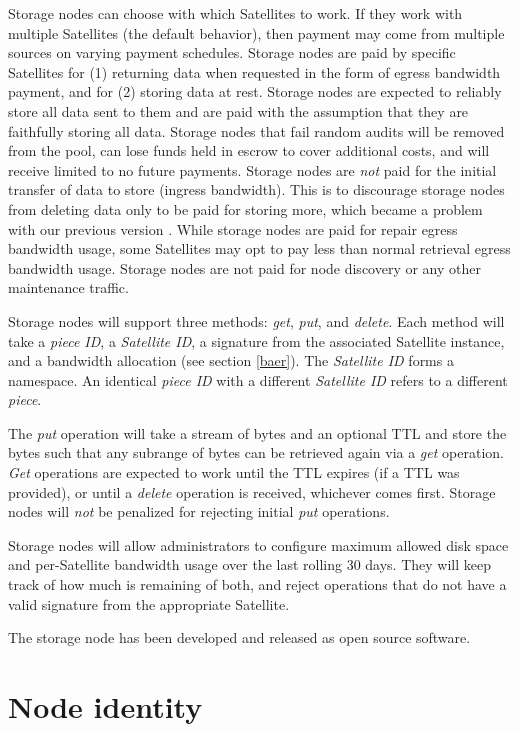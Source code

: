 \documentclass[8pt,fleqn,openany]{book}
\newcommand{\code}[1]{{\em #1}}
\begin{document}
Storage nodes can choose with which Satellites to work. If they work
with multiple Satellites (the default behavior), then payment may come from
multiple sources on varying payment schedules.
Storage nodes are paid by specific Satellites for (1) returning data when
requested in
the form of egress bandwidth payment, and for (2) storing data at rest.
Storage nodes are expected to reliably store all data sent to them and are
paid with the assumption that they are faithfully storing all data.
Storage nodes that fail random audits will be removed from the pool, can lose
funds held in escrow to cover additional costs, and will
receive
limited to no future payments.
Storage nodes are {\em not} paid for the initial transfer of data to store
(ingress bandwidth).
This is to discourage storage nodes from deleting data only to be paid for
storing more, which became a problem with our previous version \cite{storj-v2}.
While storage nodes are paid for repair egress bandwidth usage,
some Satellites may opt to pay less than normal retrieval egress bandwidth
usage.
Storage nodes are not paid for node discovery or any other maintenance traffic.

Storage nodes will support three methods: \code{get}, \code{put}, and
\code{delete}.
Each method will take a {\em piece ID}, a {\em Satellite ID}, a signature
from the associated Satellite instance, and a bandwidth allocation (see
section \ref{baer}).
The {\em Satellite ID} forms a namespace. An identical {\em piece ID} with a
different {\em Satellite ID} refers to a different {\em piece}.

The \code{put} operation will take a stream of bytes and an optional TTL and
store the bytes such
that any subrange of bytes can be retrieved again via a \code{get} operation.
\code{Get} operations are expected to work until the TTL expires (if a TTL was
provided), or until a \code{delete} operation is received, whichever comes
first.
Storage nodes will {\em not} be penalized for rejecting initial \code{put}
operations.

Storage nodes will allow administrators to configure maximum allowed disk
space and per-Satellite bandwidth usage over the last rolling 30 days.
They will keep track of how much is remaining of both, and reject operations
that do not have a valid signature from the appropriate Satellite.

The storage node has been developed and released as open source software.

\section{Node identity}\label{sec:node-id}
\end{document}
